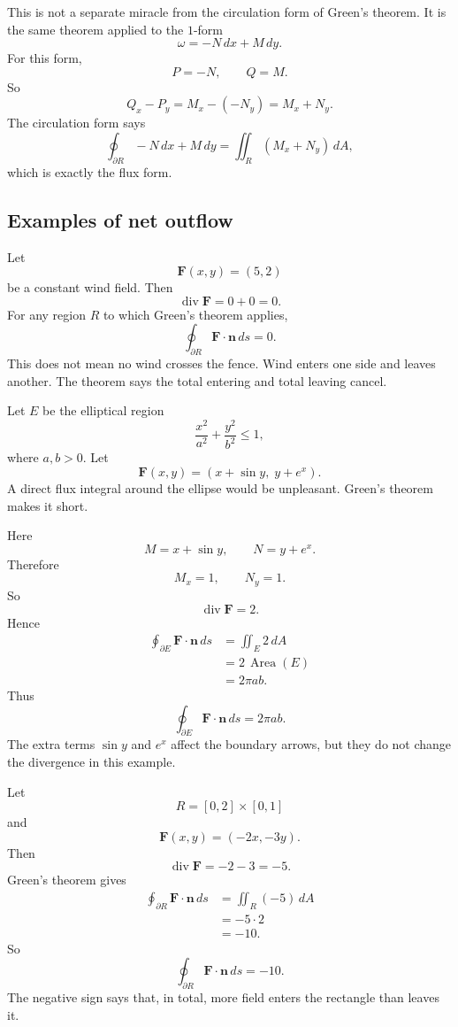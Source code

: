 This is not a separate miracle from the circulation form of Green's theorem.  It is the
same theorem applied to the \(1\)-form
\[
    \omega=-N\,dx+M\,dy.
\]
For this form,
\[
    P=-N,
    \qquad
    Q=M.
\]
So
\[
    Q_x-P_y
    =
    M_x-(-N_y)
    =
    M_x+N_y.
\]
The circulation form says
\[
    \oint_{\partial R} -N\,dx+M\,dy
    =
    \iint_R (M_x+N_y)\,dA,
\]
which is exactly the flux form.

\subsection{Examples of net outflow}

\begin{example}
Let
\[
    \mathbf F(x,y)=(5,2)
\]
be a constant wind field.  Then
\[
    \operatorname{div}\mathbf F=0+0=0.
\]
For any region \(R\) to which Green's theorem applies,
\[
\boxed{
    \oint_{\partial R}\mathbf F\cdot\mathbf n\,ds=0.
}
\]
This does not mean no wind crosses the fence.  Wind enters one side and leaves another.
The theorem says the total entering and total leaving cancel.
\end{example}

\begin{example}
Let \(E\) be the elliptical region
\[
    \frac{x^2}{a^2}+\frac{y^2}{b^2}\le 1,
\]
where \(a,b>0\).  Let
\[
    \mathbf F(x,y)=(x+\sin y,\;y+e^x).
\]
A direct flux integral around the ellipse would be unpleasant.  Green's theorem makes
it short.

Here
\[
    M=x+\sin y,
    \qquad
    N=y+e^x.
\]
Therefore
\[
    M_x=1,
    \qquad
    N_y=1.
\]
So
\[
    \operatorname{div}\mathbf F=2.
\]
Hence
\[
\begin{aligned}
    \oint_{\partial E}\mathbf F\cdot\mathbf n\,ds
    &=
    \iint_E 2\,dA\\
    &=
    2\,\operatorname{Area}(E)\\
    &=
    2\pi ab.
\end{aligned}
\]
Thus
\[
\boxed{
    \oint_{\partial E}\mathbf F\cdot\mathbf n\,ds=2\pi ab.
}
\]
The extra terms \(\sin y\) and \(e^x\) affect the boundary arrows, but they do not
change the divergence in this example.
\end{example}

\begin{example}[A sink]
Let
\[
    R=[0,2]\times[0,1]
\]
and
\[
    \mathbf F(x,y)=(-2x,-3y).
\]
Then
\[
    \operatorname{div}\mathbf F=-2-3=-5.
\]
Green's theorem gives
\[
\begin{aligned}
    \oint_{\partial R}\mathbf F\cdot\mathbf n\,ds
    &=
    \iint_R (-5)\,dA\\
    &=
    -5\cdot 2\\
    &=
    -10.
\end{aligned}
\]
So
\[
\boxed{
    \oint_{\partial R}\mathbf F\cdot\mathbf n\,ds=-10.
}
\]
The negative sign says that, in total, more field enters the rectangle than leaves it.
\end{example}

